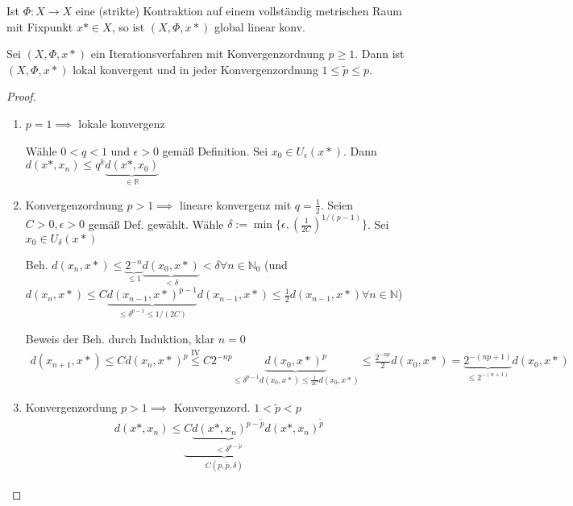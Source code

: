 \begin{example}
	Ist $\Phi: X \rightarrow X$ eine (strikte) Kontraktion auf einem vollständig metrischen Raum mit Fixpunkt $x* \in X$, so ist $(X, \Phi, x*)$ global linear konv.
\end{example}


\begin{lemma}
	Sei $(X, \Phi, x*)$ ein Iterationsverfahren mit Konvergenzordnung $p \geq 1$. Dann ist $(X, \Phi, x*)$ lokal konvergent und in jeder Konvergenzordnung $1 \leq \tilde{p} \leq p$.
\end{lemma}

\begin{proof}
	\begin{enumerate}
		\item $p=1 \implies$ lokale konvergenz
		
		Wähle $0 < q < 1$ und $\epsilon > 0$ gemäß Definition. Sei $x_0 \in U_\epsilon(x*)$. Dann $d(x*, x_n) \leq q^k \underbrace{d(x*, x_0)}_{\in \mathbb{R}}$
		
		\item Konvergenzordnung $p > 1 \implies$ lineare konvergenz mit $q = \frac{1}{2}$. Seien $C>0, \epsilon>0$ gemäß Def. gewählt. Wähle $\delta := \min\{\epsilon, \left(\frac{1}{2C}\right)^{1/(p-1)}\}$. Sei $x_0 \in U_\delta(x*)$
		
		Beh. $d(x_n, x*) \leq \underbrace{2^{-n}}_{\leq 1} \underbrace{d(x_0, x*)}_{<\delta} < \delta \forall n \in \mathbb{N}_0$ (und $d(x_n, x*) \leq C \underbrace{d(x_{n-1}, x*)^{p-1}}_{\leq \delta^{p-1} \leq 1/(2C)} d(x_{n-1}, x*) \leq \frac{1}{2} d(x_{n-1}, x*) \forall n \in \mathbb{N}$)
		
		Beweis der Beh. durch Induktion, klar $n=0$
		\begin{align*}
			d(x_{n+1}, x*) \leq C d(x_n, x*)^p \overset{\text{IV}}{\leq} C 2^{-np} \underbrace{d(x_0, x*)^p}_{\leq \delta^{p-1} d(x_0, x*) \leq \frac{1}{2C} d(x_0, x*)} \leq \frac{2^{-np}}{2} d(x_0, x*) = \underbrace{2^{-(np+1)}}_{\leq 2^{-(n+1)}} d(x_0, x*)
		\end{align*}
		
		\item Konvergenzordung $p > 1 \implies$ Konvergenzord. $1 < \tilde{p} < p$
		\begin{align*}
			d(x*, x_n) \leq \underbrace{C \underbrace{d(x*, x_n)^{p-\tilde{p}}}_{< \delta^{p-\tilde{p}}} }_{C(p, \tilde{p}, \delta)} d(x*, x_n)^{\tilde{p}}
			\end{align*}
		\end{enumerate}
	\end{proof}
	
